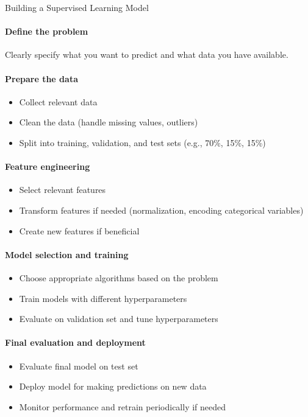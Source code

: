 \begin{KR}{Building a Supervised Learning Model}
\paragraph{Define the problem}
Clearly specify what you want to predict and what data you have available.

\paragraph{Prepare the data}
\begin{itemize}
    \item Collect relevant data
    \item Clean the data (handle missing values, outliers)
    \item Split into training, validation, and test sets (e.g., 70\%, 15\%, 15\%)
\end{itemize}

\paragraph{Feature engineering}
\begin{itemize}
    \item Select relevant features
    \item Transform features if needed (normalization, encoding categorical variables)
    \item Create new features if beneficial
\end{itemize}

\paragraph{Model selection and training}
\begin{itemize}
    \item Choose appropriate algorithms based on the problem
    \item Train models with different hyperparameters
    \item Evaluate on validation set and tune hyperparameters
\end{itemize}

\paragraph{Final evaluation and deployment}
\begin{itemize}
    \item Evaluate final model on test set
    \item Deploy model for making predictions on new data
    \item Monitor performance and retrain periodically if needed
\end{itemize}
\end{KR}

